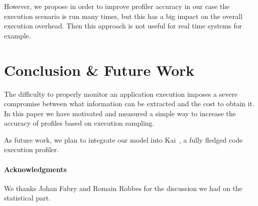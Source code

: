 \documentclass{sig-alternate}
\newcommand{\jp}[1]{\nb{Juan Pablo}{green}{#1}}
\newcommand{\seclabel}[1]{\label{sec:#1}}
\begin{document}



However, we propose in order to improve profiler accuracy in our case the execution scenario is run many times, but this has a big impact on the overall execution overhead. Then this approach is not useful for real time systems for example.

\section{Conclusion \& Future Work}\seclabel{conclusion}

The difficulty to properly monitor an application execution imposes a severe compromise between what information can be extracted and the cost to obtain it. In this paper we have motivated and measured a simple way to increase the accuracy of profiles based on execution sampling.

As future work, we plan to integrate our model into Kai~\cite{Berg11f}, a fully fledged code execution profiler.


\paragraph{Acknowledgments} We thanks Johan Fabry and Romain Robbes for the discussion we had on the statistical part.





%
\end{document}

